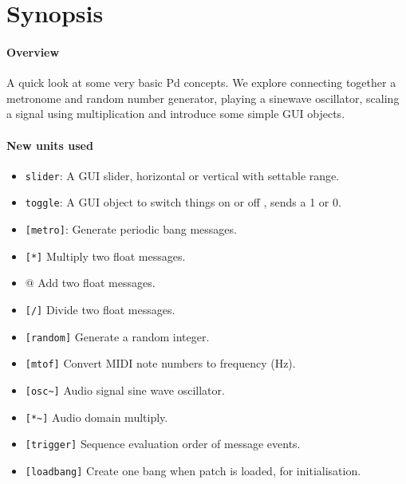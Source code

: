 \section{Synopsis}

\paragraph{Overview}
A quick look at some very basic Pd concepts. We explore connecting together a metronome and random number generator, playing a sinewave
oscillator, scaling a signal using multiplication and introduce some simple GUI objects.


\paragraph{New units used}
\begin{itemize}
\item \verb+slider+: A GUI slider, horizontal or vertical with settable range.
\item \verb+toggle+: A GUI object to switch things on or off , sends a 1 or 0.
\item \verb+[metro]+: Generate periodic bang messages.
\item \verb+[*]+ Multiply two float messages.
\item \verb@[+]@ Add two float messages.
\item \verb+[/]+ Divide two float messages.
\item \verb+[random]+ Generate a random integer.
\item \verb+[mtof]+ Convert MIDI note numbers to frequency (Hz).
\item \verb+[osc~]+ Audio signal sine wave oscillator.
\item \verb+[*~]+ Audio domain multiply.
\item \verb+[trigger]+ Sequence evaluation order of message events.
\item \verb+[loadbang]+ Create one bang when patch is loaded, for initialisation.
\end{itemize} 



